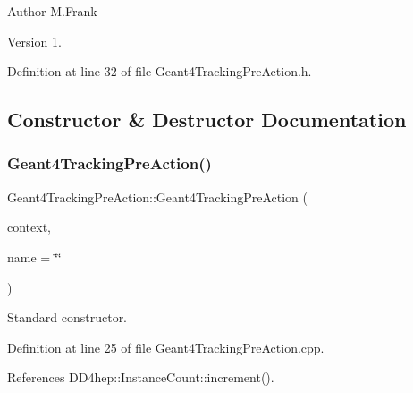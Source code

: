 \begin{DoxyAuthor}{Author}
M.\+Frank 
\end{DoxyAuthor}
\begin{DoxyVersion}{Version}
1. 
\end{DoxyVersion}


Definition at line 32 of file Geant4\+Tracking\+Pre\+Action.\+h.



\subsection{Constructor \& Destructor Documentation}
\hypertarget{class_d_d4hep_1_1_simulation_1_1_geant4_tracking_pre_action_a7727fa75c8c1ee2a81b105d4e8aa29a5}{}\label{class_d_d4hep_1_1_simulation_1_1_geant4_tracking_pre_action_a7727fa75c8c1ee2a81b105d4e8aa29a5} 
\subsubsection{\texorpdfstring{Geant4\+Tracking\+Pre\+Action()}{Geant4TrackingPreAction()}}
{\footnotesize\ttfamily Geant4\+Tracking\+Pre\+Action\+::\+Geant4\+Tracking\+Pre\+Action (\begin{DoxyParamCaption}\item[{\hyperlink{class_d_d4hep_1_1_simulation_1_1_geant4_context}{Geant4\+Context} $\ast$}]{context,  }\item[{const std\+::string \&}]{name = {\ttfamily \char`\"{}\char`\"{}} }\end{DoxyParamCaption})}



Standard constructor. 



Definition at line 25 of file Geant4\+Tracking\+Pre\+Action.\+cpp.



References D\+D4hep\+::\+Instance\+Count\+::increment().

\hypertarget{class_d_d4hep_1_1_simulation_1_1_geant4_tracking_pre_action_a47e7a397ae402a4f4d7ec9cfdb0bb143}{}\label{class_d_d4hep_1_1_simulation_1_1_geant4_tracking_pre_action_a47e7a397ae402a4f4d7ec9cfdb0bb143} 
